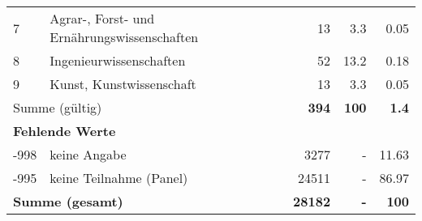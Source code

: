 \begin{longtable}{lXrrr}
     7 &
     \multicolumn{1}{X}{ Agrar-, Forst- und Ernährungswissenschaften   } &


       \num{13} &
       \num[round-mode=places,round-precision=2]{3.3} &
         \num[round-mode=places,round-precision=2]{0.05} \\

     8 &
     \multicolumn{1}{X}{ Ingenieurwissenschaften   } &


       \num{52} &
       \num[round-mode=places,round-precision=2]{13.2} &
         \num[round-mode=places,round-precision=2]{0.18} \\

     9 &
     \multicolumn{1}{X}{ Kunst, Kunstwissenschaft   } &


       \num{13} &
       \num[round-mode=places,round-precision=2]{3.3} &
         \num[round-mode=places,round-precision=2]{0.05} \\
     \midrule
     \multicolumn{2}{l}{Summe (gültig)} &
       \textbf{\num{394}} &
     \textbf{\num{100}} &
       \textbf{\num[round-mode=places,round-precision=2]{1.4}} \\
     \multicolumn{5}{l}{\textbf{Fehlende Werte}}\\
       -998 &
       keine Angabe &
         \num{3277} &
        - &
         \num[round-mode=places,round-precision=2]{11.63} \\
       -995 &
       keine Teilnahme (Panel) &
         \num{24511} &
        - &
         \num[round-mode=places,round-precision=2]{86.97} \\
     \midrule
     \multicolumn{2}{l}{\textbf{Summe (gesamt)}} &
          \textbf{\num{28182}} &
        \textbf{-} &
        \textbf{\num{100}} \\
     \bottomrule
     \end{longtable}
     
